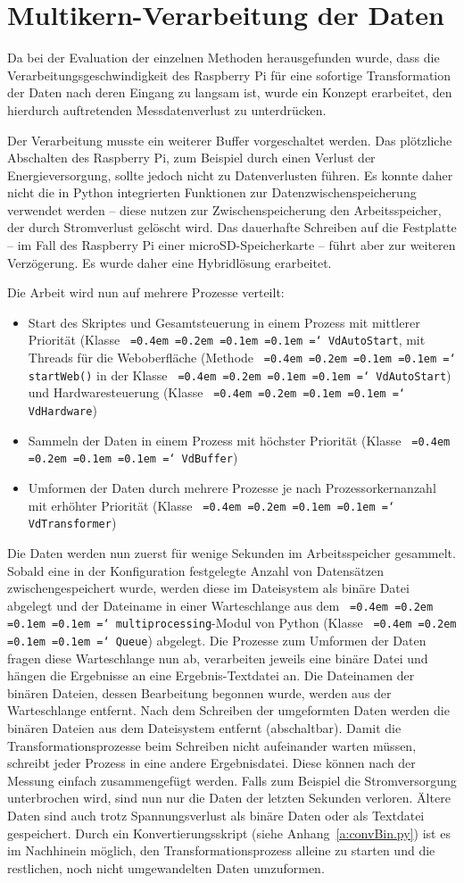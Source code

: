 \documentclass[a4paper,12pt,bibliography=totoc, listof=totoc,titlepage,pointlessnumbers]{scrreprt}
\newcommand*\justify{%
  \fontdimen2\font=0.4em%
  \fontdimen3\font=0.2em%
  \fontdimen4\font=0.1em%
  \fontdimen7\font=0.1em%
  \hyphenchar\font=`\-%
}
\newcommand{\code}[1]{\texttt{\justify{#1}}}
\begin{document}
\section{Multikern-Verarbeitung der Daten}
\label{s:multikern}
Da bei der Evaluation der einzelnen Methoden herausgefunden wurde, dass die Verarbeitungsgeschwindigkeit des Rasp\-berry Pi für eine sofortige Transformation der Daten nach deren Eingang zu langsam ist, wurde ein Konzept erarbeitet, den hierdurch auftretenden Messdatenverlust zu unterdrücken.

Der Verarbeitung musste ein weiterer Buffer vorgeschaltet werden. Das plötzliche Abschalten des Rasp\-berry Pi, zum Beispiel durch einen Verlust der Energieversorgung, sollte jedoch nicht zu Datenverlusten füh\-ren. Es konnte daher nicht die in Python integrierten Funktionen zur Datenzwischenspeicherung verwendet werden -- diese nutzen zur Zwischenspeicherung den Arbeitsspeicher, der durch Stromverlust gelöscht wird. Das dauerhafte Schreiben auf die Festplatte -- im Fall des Rasp\-berry Pi einer microSD-Speicherkarte -- führt aber zur weiteren Verzögerung. Es wurde daher eine Hybridlösung erarbeitet.

Die Arbeit wird nun auf mehrere Prozesse verteilt:
\begin{itemize}
 \item Start des Skriptes und Gesamtsteuerung in einem Prozess mit mittlerer Priorität (Klasse \code{VdAutoStart}, mit Threads für die Weboberfläche (Methode \code{startWeb()} in der Klasse \code{VdAutoStart}) und Hardwaresteuerung (Klasse \code{VdHardware})
 \item Sammeln der Daten in einem Prozess mit höchster Priorität (Klasse \code{VdBuffer})
 \item Umformen der Daten durch mehrere Prozesse je nach Prozessorkernanzahl mit erhöhter Priorität (Klasse \code{VdTransformer})
\end{itemize}

Die Daten werden nun zuerst für wenige Sekunden im Arbeitsspeicher gesammelt. Sobald eine in der Konfiguration festgelegte Anzahl von Datensätzen zwischengespeichert wurde, werden diese im Dateisystem als binäre Datei abgelegt und der Dateiname in einer Warteschlange aus dem \code{multiprocessing}-Modul von Python (Klasse \code{Queue}) abgelegt. Die Prozesse zum Umformen der Daten fragen diese Warteschlange nun ab, verarbeiten jeweils eine binäre Datei und hängen die Ergebnisse an eine Ergebnis-Textdatei an. Die Dateinamen der binären Dateien, dessen Bearbeitung begonnen wurde, werden aus der Warteschlange entfernt. Nach dem Schreiben der umgeformten Daten werden die binären Dateien aus dem Dateisystem entfernt (abschaltbar). Damit die Transformationsprozesse beim Schreiben nicht aufeinander warten müssen, schreibt jeder Prozess in eine andere Ergebnisdatei. Diese können nach der Messung einfach zusammengefügt werden. Falls zum Beispiel die Strom\-ver\-sor\-gung unterbrochen wird, sind nun nur die Daten der letzten Sekunden verloren. Ältere Daten sind auch trotz Spannungsverlust als binäre Daten oder als Textdatei gespeichert. Durch ein Konvertierungsskript (siehe Anhang~\ref{a:convBin.py}) ist es im Nachhinein möglich, den Transformationsprozess alleine zu starten und die restlichen, noch nicht umgewandelten Daten umzuformen.
\end{document}
